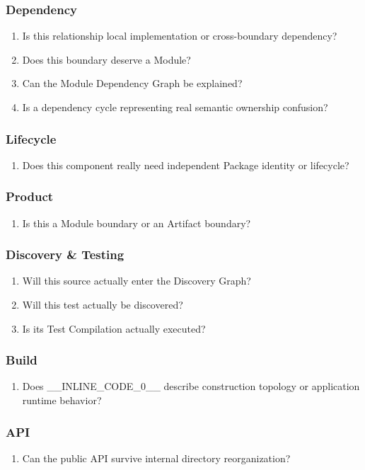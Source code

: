 \documentclass[11pt,a4paper]{article}
\begin{document}
\subsubsection{Dependency}
\begin{enumerate}
  \item Is this relationship local implementation or cross-boundary dependency?
  \item Does this boundary deserve a Module?
  \item Can the Module Dependency Graph be explained?
  \item Is a dependency cycle representing real semantic ownership confusion?
\end{enumerate}
\subsubsection{Lifecycle}
\begin{enumerate}
  \item Does this component really need independent Package identity or lifecycle?
\end{enumerate}
\subsubsection{Product}
\begin{enumerate}
  \item Is this a Module boundary or an Artifact boundary?
\end{enumerate}
\subsubsection{Discovery \& Testing}
\begin{enumerate}
  \item Will this source actually enter the Discovery Graph?
  \item Will this test actually be discovered?
  \item Is its Test Compilation actually executed?
\end{enumerate}
\subsubsection{Build}
\begin{enumerate}
  \item Does \_\_INLINE\_CODE\_0\_\_ describe construction topology or application runtime behavior?
\end{enumerate}
\subsubsection{API}
\begin{enumerate}
  \item Can the public API survive internal directory reorganization?
\end{enumerate}
\end{document}
